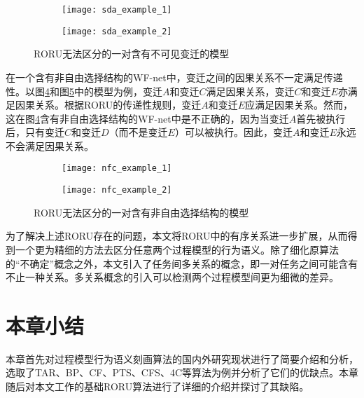 \begin{figure}[htbp]
  \centering
  \begin{subfigure}[b]{0.45\textwidth}
    \centering
    \texttt{[image: sda\_example\_1]}
    \caption{\label{fig:sda_example_1}}
  \end{subfigure}
  \hspace{1em}
  \begin{subfigure}[b]{0.45\textwidth}
    \centering
    \texttt{[image: sda\_example\_2]}
    \caption{\label{fig:sda_example_2}}
  \end{subfigure}
  \vspace{6pt}
  \caption{RORU无法区分的一对含有不可见变迁的模型}
  \label{fig:sda_example}
\end{figure}

在一个含有非自由选择结构\cite{de2003workflow}的WF-net中，变迁之间的因果关系不一定满足传递性。以图\ref{fig:nfc_example_1}和图\ref{fig:nfc_example_2}中的模型为例，变迁$A$和变迁$C$满足因果关系，变迁$C$和变迁$E$亦满足因果关系。根据RORU的传递性规则，变迁$A$和变迁$E$应满足因果关系。然而，这在图\ref{fig:nfc_example_1}含有非自由选择结构的WF-net中是不正确的，因为当变迁$A$首先被执行后，只有变迁$C$和变迁$D$（而不是变迁$E$）可以被执行。因此，变迁$A$和变迁$E$永远不会满足因果关系。

\begin{figure}[htbp]
  \centering
  \begin{subfigure}[b]{0.45\textwidth}
    \centering
    \texttt{[image: nfc\_example\_1]}
    \caption{\label{fig:nfc_example_1}}
  \end{subfigure}
  \hspace{1em}
  \begin{subfigure}[b]{0.45\textwidth}
    \centering
    \texttt{[image: nfc\_example\_2]}
    \caption{\label{fig:nfc_example_2}}
  \end{subfigure}
  \vspace{6pt}
  \caption{RORU无法区分的一对含有非自由选择结构的模型}
  \label{fig:nfc_example}
\end{figure}

为了解决上述RORU存在的问题，本文将RORU中的有序关系进一步扩展，从而得到一个更为精细的方法去区分任意两个过程模型的行为语义。除了细化原算法的“不确定”概念之外，本文引入了任务间多关系的概念，即一对任务之间可能含有不止一种关系。多关系概念的引入可以检测两个过程模型间更为细微的差异。

\section{本章小结}
本章首先对过程模型行为语义刻画算法的国内外研究现状进行了简要介绍和分析，选取了TAR、BP、CF、PTS、CFS、4C等算法为例并分析了它们的优缺点。本章随后对本文工作的基础RORU算法进行了详细的介绍并探讨了其缺陷。
